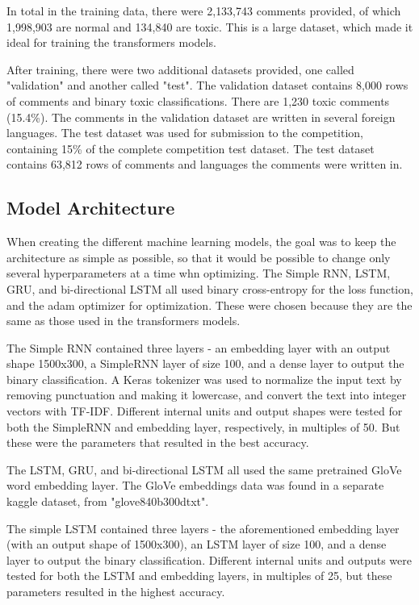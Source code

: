 \documentclass{article}
\begin{document}
In total in the training data, there were 2,133,743 comments provided, of which 1,998,903 are normal and 134,840 are toxic. This is a large dataset, which made it ideal for training the transformers models.

After training, there were two additional datasets provided, one called "validation" and another called "test". The validation dataset contains 8,000 rows of comments and binary toxic classifications. There are 1,230 toxic comments (15.4\%). The comments in the validation dataset are written in several foreign languages. The test dataset was used for submission to the competition, containing 15\% of the complete competition test dataset. The test dataset contains 63,812 rows of comments and languages the comments were written in.

\subsection{Model Architecture}

When creating the different machine learning models, the goal was to keep the architecture as simple as possible, so that it would be possible to change only several hyperparameters at a time whn optimizing. The Simple RNN, LSTM, GRU, and bi-directional LSTM all used binary cross-entropy for the loss function, and the adam optimizer for optimization. These were chosen because they are the same as those used in the transformers models. 

The Simple RNN contained three layers - an embedding layer with an output shape 1500x300, a SimpleRNN layer of size 100, and a dense layer to output the binary classification. A Keras tokenizer was used to normalize the input text by removing punctuation and making it lowercase, and convert the text into integer vectors with TF-IDF. Different internal units and output shapes were tested for both the SimpleRNN and embedding layer, respectively, in multiples of 50. But these were the parameters that resulted in the best accuracy.

The LSTM, GRU, and bi-directional LSTM all used the same pretrained GloVe word embedding layer. The GloVe embeddings data was found in a separate kaggle dataset, from "glove840b300dtxt".

The simple LSTM contained three layers - the aforementioned embedding layer (with an output shape of 1500x300), an LSTM layer of size 100, and a dense layer to output the binary classification. Different internal units and outputs were tested for both the LSTM and embedding layers, in multiples of 25, but these parameters resulted in the highest accuracy.
\end{document}
